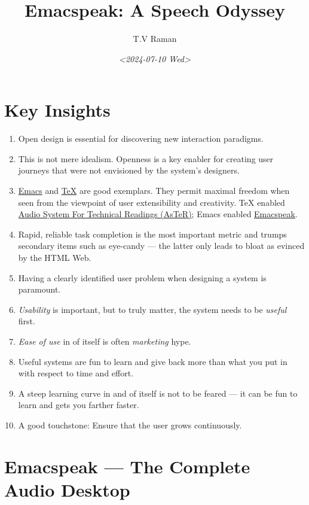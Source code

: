 \documentclass[11pt]{article}
\author{T.V Raman}
\date{\textit{<2024-07-10 Wed>}}
\title{Emacspeak:  A Speech Odyssey}
\begin{document}
\maketitle
\tableofcontents

\section{Key Insights}
\label{sec:org97d5fc7}

\begin{enumerate}
\item Open design is essential  for discovering new interaction
paradigms.
\item This is not mere idealism.  Openness is a key enabler for
creating   user journeys that were not  envisioned by the
system's designers.
\item \href{https://www.gnu.org/s/emacs/}{Emacs} and  \href{https://en.wikipedia.org/wiki/TeX}{\TeX{}}    are good exemplars. They  permit maximal freedom
 when seen from the viewpoint of user extensibility and
creativity. \TeX{} enabled \href{https://emacspeak.blogspot.com/2022/12/aster-spoken-math-on-emacspeak-audio\_21.html}{Audio System For Technical Readings (AsTeR)}; Emacs enabled \href{https://emacspeak.sourceforge.net}{Emacspeak}.
\item Rapid, reliable task completion is the most important metric and
trumps secondary items such as eye-candy --- the latter only
leads to bloat as evinced by the HTML Web.
\item Having a clearly identified user problem when designing a system
is paramount.
\item \emph{Usability} is important, but to  truly matter, the
system needs to be \emph{useful} first.
\item \emph{Ease of use} in of itself is often \emph{marketing} hype.
\item Useful systems are fun to learn and give back more than what you put
in with respect to time and effort.
\item A steep learning curve in and of itself is not to be feared --- it
can be fun to learn and  gets you farther faster.
\item A good touchstone: Ensure that the user grows continuously.
\end{enumerate}
\section{Emacspeak --- The Complete Audio Desktop}
\label{sec:org3f12285}
\end{document}
